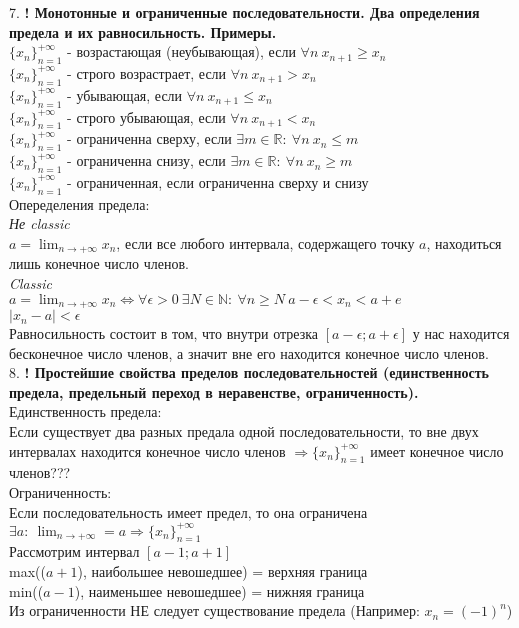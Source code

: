 \documentclass[12pt]{article}
\begin{document}
7. \textbf{! Монотонные и ограниченные последовательности. Два определения предела и их равносильность. Примеры.}\\
$\{x_n\}_{n=1}^{+\infty}$ - возрастающая (неубывающая), если $\forall n\ x_{n+1} \ge x_n$\\
$\{x_n\}_{n=1}^{+\infty}$ - строго возрастрает, если $\forall n\ x_{n+1} > x_n$\\
$\{x_n\}_{n=1}^{+\infty}$ - убывающая, если $\forall n\ x_{n+1} \le x_n$\\
$\{x_n\}_{n=1}^{+\infty}$ - строго убывающая, если $\forall n\ x_{n+1} < x_n$\\
$\{x_n\}_{n=1}^{+\infty}$ - ограниченна сверху, если $\exists m \in \mathbb{R}:\ \forall n\ x_n \le m$\\
$\{x_n\}_{n=1}^{+\infty}$ - ограниченна снизу, если $\exists m \in \mathbb{R}:\ \forall n\ x_n \ge m$\\
$\{x_n\}_{n=1}^{+\infty}$ - ограниченная, если ограниченна сверху и снизу\\
Опеределения предела:\\
\textit{Не classic}\\
$a = \lim_{n \rightarrow +\infty}x_n$, если  все любого интервала, содержащего точку $a$, находиться лишь конечное число членов.\\
\textit{Classic}\\
$a = \lim_{n \rightarrow +\infty}x_n \Leftrightarrow \forall \epsilon > 0\ \exists N \in \mathbb{N}:\ \forall n \ge N\ a - \epsilon < x_n < a + e$\\
$|x_n - a| < \epsilon$\\
Равносильность состоит в том, что внутри отрезка $[a-\epsilon; a+\epsilon]$ у нас находится бесконечное число членов, а значит вне его находится конечное число членов.\\

8. \textbf{! Простейшие свойства пределов последовательностей (единственность предела, предельный переход в неравенстве, ограниченность).}
Единственность предела:\\
Если существует два разных предала одной последовательности, то вне двух интервалах находится конечное число членов $\Rightarrow\{x_n\}_{n=1}^{+\infty}$ имеет конечное число членов???\\

Ограниченность:\\
Если последовательность имеет предел, то она ограничена\\
$\exists a:\ \lim_{n \rightarrow +\infty} = a \Rightarrow \{x_n\}_{n=1}^{+\infty}$\\
Рассмотрим интервал $[a-1; a+1]$\\
max(($a+1$), наибольшее невошедшее) = верхняя граница\\
min(($a-1$), наименьшее невошедшее) = нижняя граница\\
Из ограниченности НЕ следует существование предела (Например: $x_n = (-1)^n$)\\
\end{document}
